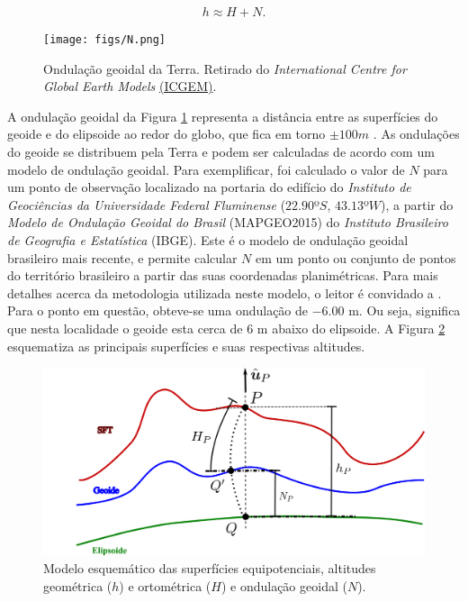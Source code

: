 \begin{equation}
\label{eq:geometric}
\displaystyle {h\approx H+N}.
\end{equation}

\begin{figure}[H]
	\centering
	\texttt{[image: figs/N.png]}
	\caption{Ondulação geoidal da Terra. Retirado do \textit{International Centre for Global Earth Models} \href{http://icgem.gfz-potsdam.de/home}{(ICGEM)}.}
	\label{fig:N}
\end{figure}
\FloatBarrier
A ondulação geoidal da Figura \ref{fig:N} representa a distância entre as superfícies do geoide e do elipsoide ao redor do globo, que fica em torno $\pm 100m$ \cite{jekeli2000}. As ondulações do geoide se distribuem pela Terra e podem ser calculadas de acordo com um modelo de ondulação geoidal. Para exemplificar, foi calculado o valor de $N$ para um ponto de observação localizado na portaria do edifício do \textit{Instituto de Geociências da Universidade Federal Fluminense} ($22.90$º$S$, $43.13$º$W$), a partir do \textit{Modelo de Ondulação Geoidal do Brasil} (MAPGEO2015) do \textit{Instituto Brasileiro de Geografia e Estatística} (IBGE). Este é o modelo de ondulação geoidal brasileiro mais recente, e permite calcular $N$ em um ponto ou conjunto de pontos do território brasileiro a partir das suas coordenadas planimétricas. Para mais detalhes acerca da metodologia utilizada neste modelo, o leitor é convidado a . Para o ponto em questão, obteve-se uma ondulação de $-6.00$ m. Ou seja, significa que nesta localidade o geoide esta cerca de $6$ m abaixo do elipsoide. A Figura \ref{fig:superficies equipotenciais} esquematiza as principais superfícies e suas respectivas altitudes.

\begin{figure}[H]
	\centering
	\includegraphics[scale=1.2]{figs/s.png}
	\caption{Modelo esquemático das superfícies equipotenciais, altitudes geométrica ($h$) e ortométrica ($H$) e ondulação geoidal ($N$).}
	\label{fig:superficies equipotenciais}
\end{figure}


